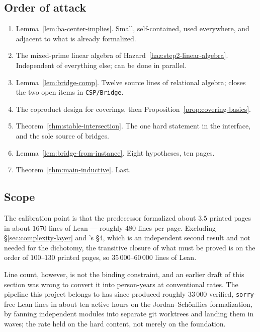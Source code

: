 \subsection{Order of attack}\label{sec:order}

\begin{enumerate}\tightlist
\item Lemma~\ref{lem:ba-center-implies}. Small, self-contained, used everywhere,
  and adjacent to what is already formalized.
\item The mixed-prime linear algebra of Hazard~\ref{haz:step2-linear-algebra}.
  Independent of everything else; can be done in parallel.
\item Lemma~\ref{lem:bridge-comp}. Twelve source lines of relational algebra;
  closes the two open items in \texttt{CSP/Bridge}.
\item The coproduct design for coverings, then
  Proposition~\ref{prop:covering-basics}.
\item Theorem~\ref{thm:stable-intersection}. The one hard statement in the
  interface, and the sole source of bridges.
\item Lemma~\ref{lem:bridge-from-instance}. Eight hypotheses, ten pages.
\item Theorem~\ref{thm:main-inductive}. Last.
\end{enumerate}

\subsection{Scope}\label{sec:scope}

The calibration point is that the predecessor formalized about $3.5$ printed
pages in about $1670$ lines of Lean --- roughly $480$ lines per page. Excluding
\S\ref{sec:complexity-layer} and \cite{ZhukSimplified}'s \S4, which is an
independent second result and not needed for the dichotomy, the transitive
closure of what must be proved is on the order of $100$--$130$ printed pages,
so $35\,000$--$60\,000$ lines of Lean.

Line count, however, is not the binding constraint, and an earlier draft of this
section was wrong to convert it into person-years at conventional rates. The
pipeline this project belongs to has since produced roughly $33\,000$ verified,
\texttt{sorry}-free Lean lines in about ten active hours on the
Jordan--Sch\"onflies formalization, by fanning independent modules into separate
git worktrees and landing them in waves; the rate held on the hard content, not
merely on the foundation.

